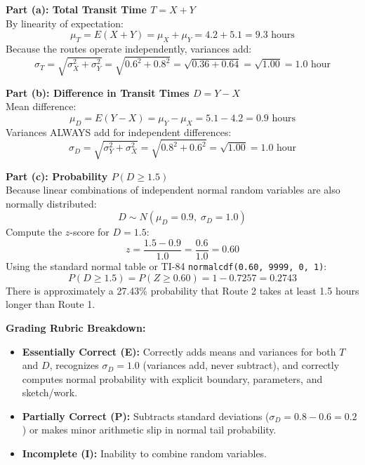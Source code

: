 \begin{frqrubricbox}
\textbf{Part (a): Total Transit Time $T = X + Y$}\\
By linearity of expectation:
\[ \mu_T = E(X + Y) = \mu_X + \mu_Y = 4.2 + 5.1 = 9.3\text{ hours} \]
Because the routes operate independently, variances add:
\[ \sigma_T = \sqrt{\sigma_X^2 + \sigma_Y^2} = \sqrt{0.6^2 + 0.8^2} = \sqrt{0.36 + 0.64} = \sqrt{1.00} = 1.0\text{ hour} \]

\textbf{Part (b): Difference in Transit Times $D = Y - X$}\\
Mean difference:
\[ \mu_D = E(Y - X) = \mu_Y - \mu_X = 5.1 - 4.2 = 0.9\text{ hours} \]
Variances ALWAYS add for independent differences:
\[ \sigma_D = \sqrt{\sigma_Y^2 + \sigma_X^2} = \sqrt{0.8^2 + 0.6^2} = \sqrt{1.00} = 1.0\text{ hour} \]

\textbf{Part (c): Probability $P(D \ge 1.5)$}\\
Because linear combinations of independent normal random variables are also normally distributed:
\[ D \sim N(\mu_D = 0.9, \; \sigma_D = 1.0) \]
Compute the $z$-score for $D = 1.5$:
\[ z = \frac{1.5 - 0.9}{1.0} = \frac{0.6}{1.0} = 0.60 \]
Using the standard normal table or TI-84 \texttt{normalcdf(0.60, 9999, 0, 1)}:
\[ P(D \ge 1.5) = P(Z \ge 0.60) = 1 - 0.7257 = 0.2743 \]
There is approximately a 27.43\% probability that Route 2 takes at least 1.5 hours longer than Route 1.

\textbf{Grading Rubric Breakdown:}\\
\begin{itemize}
  \item \textbf{Essentially Correct (E):} Correctly adds means and variances for both $T$ and $D$, recognizes $\sigma_D = 1.0$ (variances add, never subtract), and correctly computes normal probability with explicit boundary, parameters, and sketch/work.
  \item \textbf{Partially Correct (P):} Subtracts standard deviations ($\sigma_D = 0.8 - 0.6 = 0.2$) or makes minor arithmetic slip in normal tail probability.
  \item \textbf{Incomplete (I):} Inability to combine random variables.
\end{itemize}
\end{frqrubricbox}

